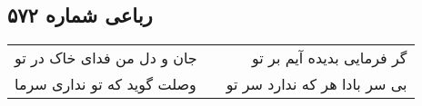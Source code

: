 \begin{center}
\section*{رباعی شماره ۵۷۲}
\label{sec:sh572}
\begin{longtable}{l p{0.5cm} r}
جان و دل من فدای خاک در تو
&&
گر فرمایی بدیده آیم بر تو
\\
وصلت گوید که تو نداری سرما
&&
بی سر بادا هر که ندارد سر تو
\\
\end{longtable}
\end{center}
